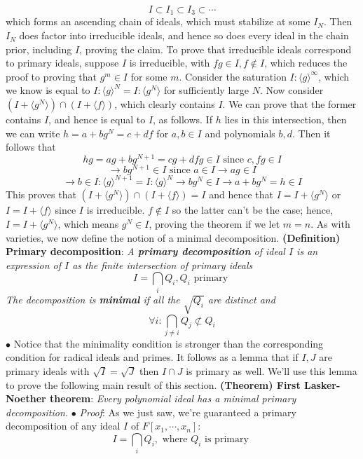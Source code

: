 \documentclass{article}
\newcommand*{\tb}{\textbf}
\newcommand*{\ti}{\textit}
\newcommand*{\n}{\newline}
\newcommand*{\nn}{\newline \newline}
\newcommand*{\Pf}{\indent \ensuremath{\bullet} \textit{Proof}: }
\newcommand*{\Fx}{\ensuremath{F[x_1, \cdots, x_n]}}
\begin{document}
$$ I \subset I_1 \subset I_3 \subset \cdots $$
which forms an ascending chain of ideals, which must stabilize at some $ I_N $. Then $ I_N $ does factor into irreducible ideals, and hence so does every ideal in the chain prior, including $ I $, proving the claim.
\n
To prove that irreducible ideals correspond to primary ideals, suppose $ I $ is irreducible, with $ f g \in I, f \notin I $, which reduces the proof to proving that $ g^m \in I $ for some $ m $. Consider the saturation $ I : \langle g \rangle^\infty $, which we know is equal to $ I : \langle g \rangle^N = I : \langle g^N \rangle $ for sufficiently large $ N $. Now consider $ (I + \langle g^N \rangle) \cap (I + \langle f \rangle) $, which clearly contains $ I $. We can prove that the former contains $ I $, and hence is equal to $ I $, as follows. If $ h $ lies in this intersection, then we can write $ h = a + b g^N = c + d f $ for $ a, b \in I $ and polynomials $ b, d $. Then it follows that
$$ h g = a g + b g^{N + 1} = c g + d f g \in I \text{ since } c, f g \in I $$ 
$$ \rightarrow b g^{N + 1} \in I \text{ since } a \in I \rightarrow a g \in I $$
$$ \rightarrow b \in I : \langle g \rangle^{N + 1} = I : \langle g \rangle^N \rightarrow b g^N \in I \rightarrow a + b g^N = h \in I $$
This proves that $ (I + \langle g^N \rangle) \cap (I + \langle f \rangle) = I $ and hence that $ I = I + \langle g^N \rangle $ or $ I = I + \langle f \rangle $ since $ I $ is irreducible. $ f \notin I $ so the latter can't be the case; hence, $ I = I + \langle g^N \rangle $, which means $ g^N \in I $, proving the theorem if we let $ m = n $. \qedsymbol
\nn
As with varieties, we now define the notion of a minimal decomposition.
\nn
\tb{(Definition) Primary decomposition}: \ti{A \tb{primary decomposition} of ideal $ I $ is an expression of $ I $ as the finite intersection of primary ideals}
$$ I = \bigcap_i Q_i, Q_i \text{ primary } $$
\indent \ti{The decomposition is \tb{minimal} if all the $ \sqrt{Q_i} $ are distinct and}
$$ \forall i: \bigcap_{j \neq i} Q_j \not\subset Q_i $$
\indent $ \bullet $ Notice that the minimality condition is stronger than the corresponding condition for radical ideals and primes.
\nn
It follows as a lemma that if $ I, J $ are primary ideals with $ \sqrt{I} = \sqrt{J} $ then $ I \cap J $ is primary as well. We'll use this lemma to prove the following main result of this section.
\nn
\tb{(Theorem) First Lasker-Noether theorem}: \ti{Every polynomial ideal has a minimal primary decomposition.}
\n
\Pf As we just saw, we're guaranteed a primary decomposition of any ideal $ I $ of $ \Fx $:
$$ I = \bigcap_i Q_i, \text{ where } Q_i \text{ is primary } $$
\end{document}
